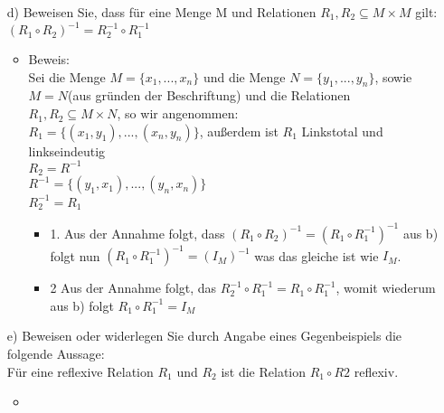 \documentclass[paper = a4, ngerman]{scrartcl}
\begin{document}
\begin{itemize}
\begin{itemize}
		 	    \end{itemize}
	 	\item [d)] Beweisen Sie, dass für eine Menge M und Relationen $R_1, R_2 \subseteq M \times M$ gilt:\\
	 	$(R_1 \circ R_2)^{-1} = R_{2}^{-1} \circ R_{1}^{-1}$
	 		\begin{itemize}
	 			\item Beweis:\\
	 				Sei die Menge $M=\{x_1,...,x_n\}$ und die Menge $N=\{y_1,...,y_n\}$, sowie\\ $M=N$(aus gründen der Beschriftung) und die Relationen $R_1,R_2 \subseteq M \times N$, so wir angenommen:\\ 
	 				$R_1=\{(x_1,y_1),...,(x_n,y_n)\}$, außerdem ist $R_1$ Linkstotal und linkseindeutig\\
	 				$R_2=R^{-1}$\\
	 				$R^{-1}=\{(y_1,x_1),...,(y_n,x_n)\}$\\
	 				$R_{2}^{-1}= R_1$\\
	 				\begin{itemize}
	 					\item 1. Aus der Annahme folgt, dass $(R_1 \circ R_2)^{-1} = (R_1 \circ R_1^{-1})^{-1}$ aus b) folgt nun $(R_1 \circ R_1^{-1})^{-1}=(I_M)^{-1}$ was das gleiche ist wie $I_M$.
	 					\item 2 Aus der Annahme folgt, das $R_{2}^{-1} \circ R_{1}^{-1}=R_1 \circ R_1^{-1}$, womit wiederum aus b) folgt $R_1 \circ R_1^{-1} = I_M$
	 				\end{itemize}
	 		\end{itemize}
	 	\item [e)] Beweisen oder widerlegen  Sie durch Angabe eines Gegenbeispiels die folgende Aussage:\\
	 	Für eine reflexive Relation $R_1$ und $R_2$ ist die Relation $R_1 \circ R2$ reflexiv.
	 		\begin{itemize}
	 			\item 
	 		\end{itemize}
	\end{itemize}
\end{document}
